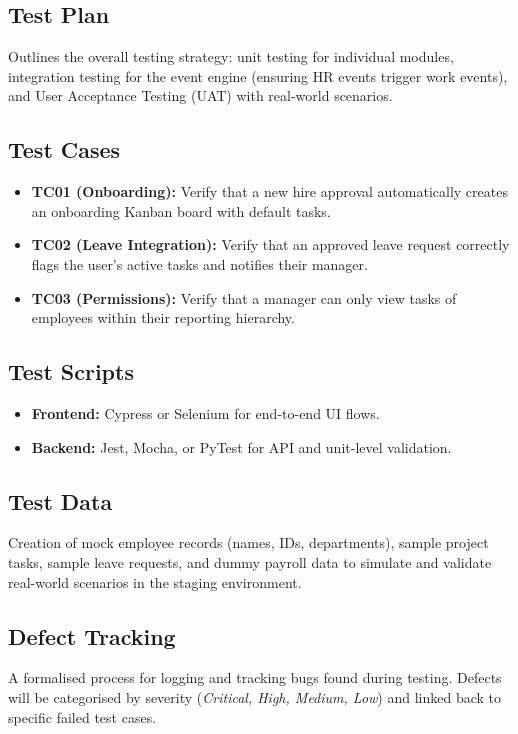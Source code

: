 \documentclass[12pt,a4paper]{report}
\begin{document}
\subsection{Test Plan}
Outlines the overall testing strategy: unit testing for individual modules, integration testing
for the event engine (ensuring HR events trigger work events), and User Acceptance Testing (UAT)
with real-world scenarios.

\subsection{Test Cases}
\begin{itemize}
  \item \textbf{TC01 (Onboarding):} Verify that a new hire approval automatically creates an onboarding Kanban board with default tasks.
  \item \textbf{TC02 (Leave Integration):} Verify that an approved leave request correctly flags the user's active tasks and notifies their manager.
  \item \textbf{TC03 (Permissions):} Verify that a manager can only view tasks of employees within their reporting hierarchy.
\end{itemize}

\subsection{Test Scripts}
\begin{itemize}
  \item \textbf{Frontend:} Cypress or Selenium for end-to-end UI flows.
  \item \textbf{Backend:} Jest, Mocha, or PyTest for API and unit-level validation.
\end{itemize}

\subsection{Test Data}
Creation of mock employee records (names, IDs, departments), sample project tasks, sample leave
requests, and dummy payroll data to simulate and validate real-world scenarios in the staging
environment.

\subsection{Defect Tracking}
A formalised process for logging and tracking bugs found during testing. Defects will be
categorised by severity (\textit{Critical, High, Medium, Low}) and linked back to specific
failed test cases.
\end{document}
